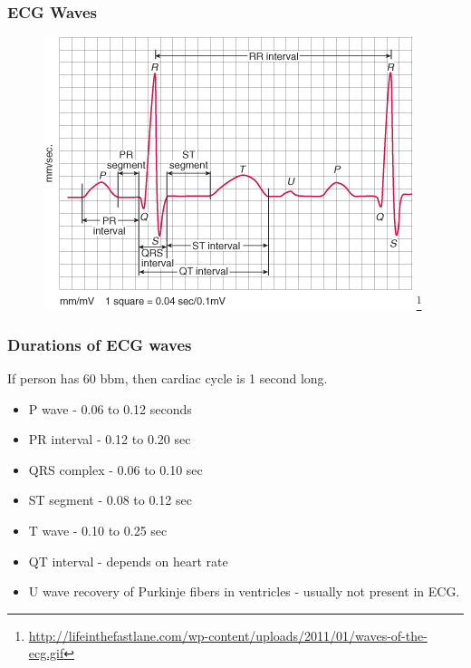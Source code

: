 \documentclass[xcolor=dvipsnames]{beamer}
\begin{document}
  \begin{frame}
    \frametitle{ECG Waves}
    \begin{figure}
    \begin{center}
        \includegraphics[height=0.8 \textheight]{Figures/waves-of-the-ecg.png}
    \footnote[frame]{\url{http://lifeinthefastlane.com/wp-content/uploads/2011/01/waves-of-the-ecg.gif}}
    \end{center}
    \end{figure}
  \end{frame}

  \begin{frame}
    \frametitle{Durations of ECG waves}
    If person has 60 bbm, then cardiac cycle is 1 second long.
    \begin{itemize}
      \item P wave - 0.06 to 0.12 seconds
      \item PR interval - 0.12 to 0.20 sec
      \item QRS complex - 0.06 to 0.10 sec
      \item ST segment - 0.08 to 0.12 sec
      \item T wave - 0.10 to 0.25 sec
      \item QT interval - depends on heart rate
      \item U wave recovery of Purkinje fibers in ventricles - usually not present in ECG.
    \end{itemize}


  \end{frame}
\end{document}
